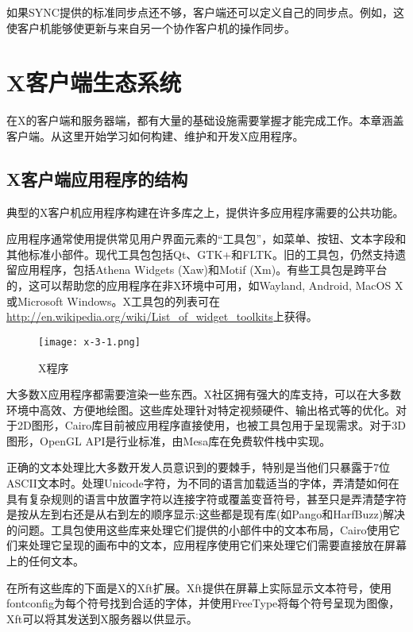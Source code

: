 如果SYNC提供的标准同步点还不够，客户端还可以定义自己的同步点。例如，这使客户机能够使更新与来自另一个协作客户机的操作同步。


\section{X客户端生态系统}

在X的客户端和服务器端，都有大量的基础设施需要掌握才能完成工作。本章涵盖客户端。从这里开始学习如何构建、维护和开发X应用程序。

\subsection{X客户端应用程序的结构}

典型的X客户机应用程序构建在许多库之上，提供许多应用程序需要的公共功能。

应用程序通常使用提供常见用户界面元素的“工具包”，如菜单、按钮、文本字段和其他标准小部件。现代工具包包括Qt、GTK+和FLTK。旧的工具包，仍然支持遗留应用程序，包括Athena Widgets (Xaw)和Motif (Xm)。有些工具包是跨平台的，这可以帮助您的应用程序在非X环境中可用，如Wayland, Android, MacOS X或Microsoft Windows。X工具包的列表可在\href{http://en.wikipedia.org/wiki/List_of_widget_toolkits}{http://en.wikipedia.org/wiki/List\_of\_widget\_toolkits}上获得。

\begin{figure}[h]
	\centering
	\texttt{[image: x-3-1.png]}
	\caption{X程序}
	\label{img-1.3.1-1}
\end{figure}

大多数X应用程序都需要渲染一些东西。X社区拥有强大的库支持，可以在大多数环境中高效、方便地绘图。这些库处理针对特定视频硬件、输出格式等的优化。对于2D图形，Cairo库目前被应用程序直接使用，也被工具包用于呈现需求。对于3D图形，OpenGL API是行业标准，由Mesa库在免费软件栈中实现。

正确的文本处理比大多数开发人员意识到的要棘手，特别是当他们只暴露于7位ASCII文本时。处理Unicode字符，为不同的语言加载适当的字体，弄清楚如何在具有复杂规则的语言中放置字符以连接字符或覆盖变音符号，甚至只是弄清楚字符是按从左到右还是从右到左的顺序显示:这些都是现有库(如Pango和HarfBuzz)解决的问题。工具包使用这些库来处理它们提供的小部件中的文本布局，Cairo使用它们来处理它呈现的画布中的文本，应用程序使用它们来处理它们需要直接放在屏幕上的任何文本。

在所有这些库的下面是X的Xft扩展。Xft提供在屏幕上实际显示文本符号，使用fontconfig为每个符号找到合适的字体，并使用FreeType将每个符号呈现为图像，Xft可以将其发送到X服务器以供显示。

